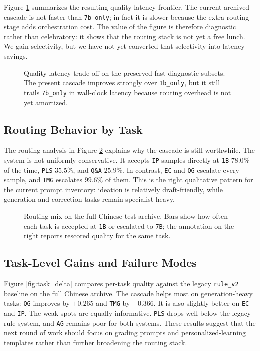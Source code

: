 \documentclass{article}
\begin{document}
Figure \ref{fig:quality_latency} summarizes the resulting quality-latency frontier. The current archived cascade is not faster than \texttt{7b\_only}; in fact it is slower because the extra routing stage adds orchestration cost. The value of the figure is therefore diagnostic rather than celebratory: it shows that the routing stack is not yet a free lunch. We gain selectivity, but we have not yet converted that selectivity into latency savings.

\begin{figure}[H]
  \centering
  
  \caption{Quality-latency trade-off on the preserved fast diagnostic subsets. The present cascade improves strongly over \texttt{1b\_only}, but it still trails \texttt{7b\_only} in wall-clock latency because routing overhead is not yet amortized.}
  \label{fig:quality_latency}
\end{figure}
\FloatBarrier

\subsection{Routing Behavior by Task}
The routing analysis in Figure \ref{fig:routing_by_task} explains why the cascade is still worthwhile. The system is not uniformly conservative. It accepts \texttt{IP} samples directly at \texttt{1B} \(78.0\%\) of the time, \texttt{PLS} \(35.5\%\), and \texttt{Q\&A} \(25.9\%\). In contrast, \texttt{EC} and \texttt{QG} escalate every sample, and \texttt{TMG} escalates \(99.6\%\) of them. This is the right qualitative pattern for the current prompt inventory: ideation is relatively draft-friendly, while generation and correction tasks remain specialist-heavy.

\begin{figure}[H]
  \centering
  
  \caption{Routing mix on the full Chinese test archive. Bars show how often each task is accepted at \texttt{1B} or escalated to \texttt{7B}; the annotation on the right reports rescored quality for the same task.}
  \label{fig:routing_by_task}
\end{figure}
\FloatBarrier

\subsection{Task-Level Gains and Failure Modes}
Figure \ref{fig:task_delta} compares per-task quality against the legacy \texttt{rule\_v2} baseline on the full Chinese archive. The cascade helps most on generation-heavy tasks: \texttt{QG} improves by \(+0.265\) and \texttt{TMG} by \(+0.366\). It is also slightly better on \texttt{EC} and \texttt{IP}. The weak spots are equally informative. \texttt{PLS} drops well below the legacy rule system, and \texttt{AG} remains poor for both systems. These results suggest that the next round of work should focus on grading prompts and personalized-learning templates rather than further broadening the routing stack.
\end{document}
